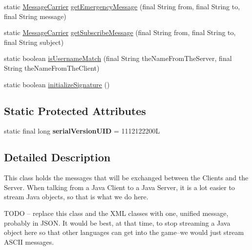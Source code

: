 \begin{DoxyCompactItemize}
\item 
static \hyperlink{classgov_1_1fnal_1_1ppd_1_1dd_1_1chat_1_1MessageCarrier}{Message\-Carrier} \hyperlink{classgov_1_1fnal_1_1ppd_1_1dd_1_1chat_1_1MessageCarrier_a41ee3b86b92786ed41ad66f9a139ab8c}{get\-Emergency\-Message} (final String from, final String to, final String message)
\item 
static \hyperlink{classgov_1_1fnal_1_1ppd_1_1dd_1_1chat_1_1MessageCarrier}{Message\-Carrier} \hyperlink{classgov_1_1fnal_1_1ppd_1_1dd_1_1chat_1_1MessageCarrier_abe59d0d2e555a9c418b51ca931647070}{get\-Subscribe\-Message} (final String from, final String to, final String subject)
\item 
static boolean \hyperlink{classgov_1_1fnal_1_1ppd_1_1dd_1_1chat_1_1MessageCarrier_abeb424991e7911d1efd533b61e35fd6a}{is\-Username\-Match} (final String the\-Name\-From\-The\-Server, final String the\-Name\-From\-The\-Client)
\item 
static boolean \hyperlink{classgov_1_1fnal_1_1ppd_1_1dd_1_1chat_1_1MessageCarrier_a5ddfee4147bfa09f7f059dfaab267da7}{initialize\-Signature} ()
\end{DoxyCompactItemize}
\subsection*{Static Protected Attributes}
\begin{DoxyCompactItemize}
\item 
\hypertarget{classgov_1_1fnal_1_1ppd_1_1dd_1_1chat_1_1MessageCarrier_a9baff4617fbbc2df811eae214ec9980c}{static final long {\bfseries serial\-Version\-U\-I\-D} = 1112122200\-L}\label{classgov_1_1fnal_1_1ppd_1_1dd_1_1chat_1_1MessageCarrier_a9baff4617fbbc2df811eae214ec9980c}

\end{DoxyCompactItemize}


\subsection{Detailed Description}
This class holds the messages that will be exchanged between the Clients and the Server. When talking from a Java Client to a Java Server, it is a lot easier to stream Java objects, so that is what we do here.

T\-O\-D\-O -- replace this class and the X\-M\-L classes with one, unified message, probably in J\-S\-O\-N. It would be best, at that time, to stop streaming a Java object here so that other languages can get into the game--we would just stream A\-S\-C\-I\-I messages.

